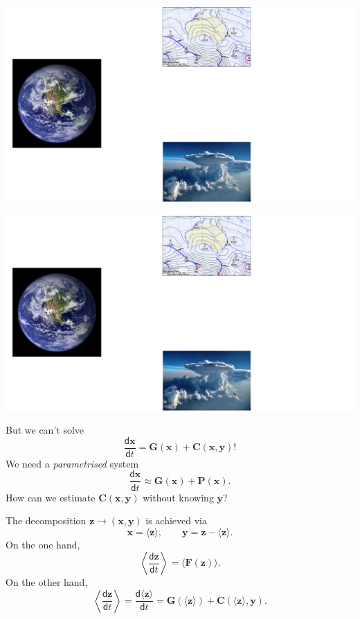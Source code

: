 \documentclass[12pt, aspectratio=169]{beamer}
\newcommand{\diff}[2]{\frac{\mathsf{d} #1}{\mathsf{d} #2}}
\renewcommand\vec{\bm}
\begin{document}
\begin{frame}
\centering
\includegraphics[width=\linewidth]{figures/introduction3.pdf}
\end{frame}

\begin{frame}
\centering
\includegraphics[width=\linewidth]{figures/introduction4.pdf}
\end{frame}

\begin{frame}
But we can't solve
\[
    \diff{\vec{x}}{t} = \vec{G}(\vec{x}) + \vec{C}(\vec{x}, \vec{y})!
\]
\vfill
We need a \emph{parametrised} system
\[
    \diff{\vec{x}}{t} \approx \vec{G}(\vec{x}) + \vec{P}(\vec{x}).
\]
\vfill
How can we estimate $\vec{C}(\vec{x}, \vec{y})$ without knowing $\vec{y}$?
\end{frame}

\begin{frame}
The decomposition $\vec{z} \to (\vec{x}, \vec{y})$ is achieved via
\[
    \vec{x} = \langle \vec{z} \rangle,
    \qquad \vec{y} = \vec{z} - \langle \vec{z} \rangle.
\]
\vfill
On the one hand,
\[
    \left \langle \diff{\vec{z}}{t} \right \rangle
    = \langle \vec{F}(\vec{z}) \rangle.
\]
\vfill
On the other hand,
\[
    \left \langle \diff{\vec{z}}{t} \right \rangle
    = \diff{\langle \vec{z} \rangle}{t}
    = \vec{G}(\langle \vec{z} \rangle)
        + \vec{C}(\langle \vec{z} \rangle, \vec{y}).
\]
\end{frame}
\end{document}
